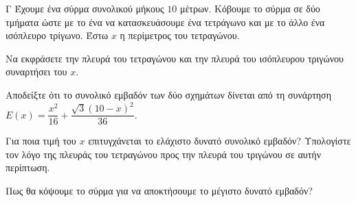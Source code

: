 \begin{thema}{Γ}
Έχουμε ένα σύρμα συνολικού μήκους $10$ μέτρων. Κόβουμε το σύρμα σε δύο τμήματα ώστε με το ένα να κατασκευάσουμε ένα τετράγωνο και με το άλλο ένα ισόπλευρο τρίγωνο. Έστω $x$ η περίμετρος του τετραγώνου.
\begin{erwthma}
  \item Να εκφράσετε την πλευρά του τετραγώνου και την πλευρά του ισόπλευρου τριγώνου συναρτήσει του $x$.
  \item Αποδείξτε ότι το συνολικό εμβαδόν των δύο σχημάτων δίνεται από τη συνάρτηση $E(x) = \dfrac{x^2}{16} + \dfrac{\sqrt{3}(10-x)^2}{36}$.
  \item Για ποια τιμή του $x$ επιτυγχάνεται το ελάχιστο δυνατό συνολικό εμβαδόν? Υπολογίστε τον λόγο της πλευράς του τετραγώνου προς την πλευρά του τριγώνου σε αυτήν περίπτωση.
  \item Πως θα κόψουμε το σύρμα για να αποκτήσουμε το μέγιστο δυνατό εμβαδόν?
\end{erwthma}
\end{thema}
